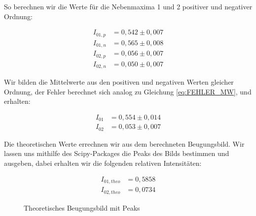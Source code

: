 \documentclass{article}
\begin{document}
So berechnen wir die Werte für die Nebenmaxima 1 und 2 positiver und negativer Ordnung:

\begin{equation}
    \begin{split}
        I_{01,p} &= 0,542 \pm 0,007 \\
        I_{01,n} &= 0,565 \pm 0,008 \\
        I_{02,p} &= 0,056 \pm 0,007 \\
        I_{02,n} &= 0,050 \pm 0,007
    \end{split}
\end{equation}

Wir bilden die Mittelwerte aus den positiven und negativen Werten gleicher Ordnung, der Fehler berechnet sich analog zu Gleichung \ref{eq:FEHLER_MW}, und erhalten:

\begin{equation}
    \begin{split}
        I_{01} &= 0,554 \pm 0,014 \\
        I_{02} &= 0,053 \pm 0,007
    \end{split}
\end{equation}

Die theoretischen Werte errechnen wir aus dem berechneten Beugungsbild. Wir lassen uns mithilfe des Scipy-Packages die Peaks des Bilds bestimmen und ausgeben, dabei erhalten wir die folgenden relativen Intensitäten:

\begin{equation}
    \begin{split}
        I_{01,theo} &= 0,5858 \\
        I_{02,theo} &= 0,0734
    \end{split}
\end{equation}

\begin{figure}[!b]
    \centering
    \caption{Theoretisches Beugungsbild mit Peaks}
    \label{fig:Beug_d_peaks}
\end{figure}
\end{document}
